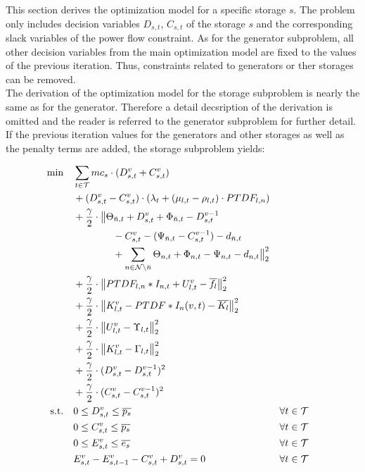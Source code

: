 This section derives the optimization model for a specific storage $s$. The problem only includes decision variables $D_{s,t}$, $C_{s,t}$ of the storage $s$ and the corresponding slack variables of the power flow constraint. As for the generator subproblem, all other decision variables from the main optimization model are fixed to the values of the previous iteration. Thus, constraints related to generators or ther storages can be removed. \\

The derivation of the optimization model for the storage subproblem is nearly the same as for the generator. Therefore a detail decsription of the derivation is omitted and the reader is referred to the generator subproblem for further detail. If the previous iteration values for the generators and other storages as well as the penalty terms are added, the storage subproblem yields:

 \begin{subequations}
	\begin{align}
		 \min \quad & \sum_{t\in\mathcal{T}} mc_s \cdot (D_{s,t}^v + C_{s,t}^v)\label{eq:sub:stor}\\
		 & + (D_{s,t}^v - C_{s,t}^v) \cdot (\lambda_t + (\mu_{l,t} - \rho_{l,t}) \cdot PTDF_{l,n}) \nonumber \\ 
		 & + \frac{\gamma}{2} \cdot \big\| \Theta_{\breve{n},t} + D_{s,t}^v + \Phi_{\breve{n},t} - D_{s,t}^{v-1} \nonumber \\
		 & \qquad \qquad - C_{s,t}^v - (\Psi_{\breve{n},t} - C_{s,t}^{v-1}) - d_{\breve{n},t} \nonumber \\
		 & \qquad \qquad + \sum_{n \in \mathcal{N} \setminus \breve{n}} \Theta_{n,t} + \Phi_{n,t} - \Psi_{n,t} - d_{n,t} \big\|^2_2 \nonumber \\
		 & + \frac{\gamma}{2} \cdot \big\|PTDF_{l,n} * I_{n,t} + U_{l,t}^v - \overline{f_l}\big\|^2_2 \nonumber \\
		 & + \frac{\gamma}{2} \cdot \big\|K_{l,t}^v - PTDF * I_n(v, t) - \overline{K_l}\big\|^2_2\nonumber \\
		 & + \frac{\gamma}{2} \cdot \big\|U_{l,t}^v - \Upsilon_{l,t}  \big\|^2_2 \nonumber\\
		 & + \frac{\gamma}{2} \cdot \big\|K_{l,t}^v - \Gamma_{l,t}  \big\|^2_2 \nonumber \\
		 & + \frac{\gamma}{2} \cdot (D_{s,t}^v - D_{s,t}^{v-1} )^2 \nonumber \\
		 & + \frac{\gamma}{2} \cdot (C_{s,t}^v - C_{s,t}^{v-1} )^2 \nonumber \\
		 \text{s.t.} \quad & 0 \leq D_{s,t}^v \leq \overline{p_s} && \forall t \in \mathcal{T} \\
		 & 0 \leq C_{s,t}^v \leq \overline{p_s} && \forall t \in \mathcal{T}\\
		 & 0 \leq E_{s,t}^v \leq \overline{e_s} && \forall t \in \mathcal{T}\\
		 & E_{s,t}^v - E_{s,t-1}^v - C_{s,t}^v + D_{s,t}^v = 0 && \forall t \in \mathcal{T}
	\end{align}
\end{subequations}

